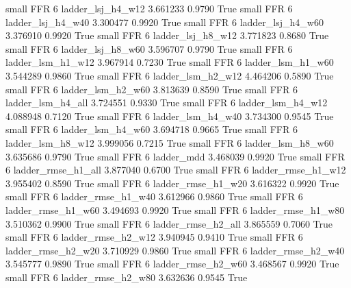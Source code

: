      small      FFR                 6        ladder_lsj_h4_w12   3.661233      0.9790    True
     small      FFR                 6        ladder_lsj_h4_w40   3.300477      0.9920    True
     small      FFR                 6        ladder_lsj_h4_w60   3.376910      0.9920    True
     small      FFR                 6        ladder_lsj_h8_w12   3.771823      0.8680    True
     small      FFR                 6        ladder_lsj_h8_w60   3.596707      0.9790    True
     small      FFR                 6        ladder_lsm_h1_w12   3.967914      0.7230    True
     small      FFR                 6        ladder_lsm_h1_w60   3.544289      0.9860    True
     small      FFR                 6        ladder_lsm_h2_w12   4.464206      0.5890    True
     small      FFR                 6        ladder_lsm_h2_w60   3.813639      0.8590    True
     small      FFR                 6        ladder_lsm_h4_all   3.724551      0.9330    True
     small      FFR                 6        ladder_lsm_h4_w12   4.088948      0.7120    True
     small      FFR                 6        ladder_lsm_h4_w40   3.734300      0.9545    True
     small      FFR                 6        ladder_lsm_h4_w60   3.694718      0.9665    True
     small      FFR                 6        ladder_lsm_h8_w12   3.999056      0.7215    True
     small      FFR                 6        ladder_lsm_h8_w60   3.635686      0.9790    True
     small      FFR                 6               ladder_mdd   3.468039      0.9920    True
     small      FFR                 6       ladder_rmse_h1_all   3.877040      0.6700    True
     small      FFR                 6       ladder_rmse_h1_w12   3.955402      0.8590    True
     small      FFR                 6       ladder_rmse_h1_w20   3.616322      0.9920    True
     small      FFR                 6       ladder_rmse_h1_w40   3.612966      0.9860    True
     small      FFR                 6       ladder_rmse_h1_w60   3.494693      0.9920    True
     small      FFR                 6       ladder_rmse_h1_w80   3.510362      0.9900    True
     small      FFR                 6       ladder_rmse_h2_all   3.865559      0.7060    True
     small      FFR                 6       ladder_rmse_h2_w12   3.940945      0.9410    True
     small      FFR                 6       ladder_rmse_h2_w20   3.710929      0.9860    True
     small      FFR                 6       ladder_rmse_h2_w40   3.545777      0.9890    True
     small      FFR                 6       ladder_rmse_h2_w60   3.468567      0.9920    True
     small      FFR                 6       ladder_rmse_h2_w80   3.632636      0.9545    True
